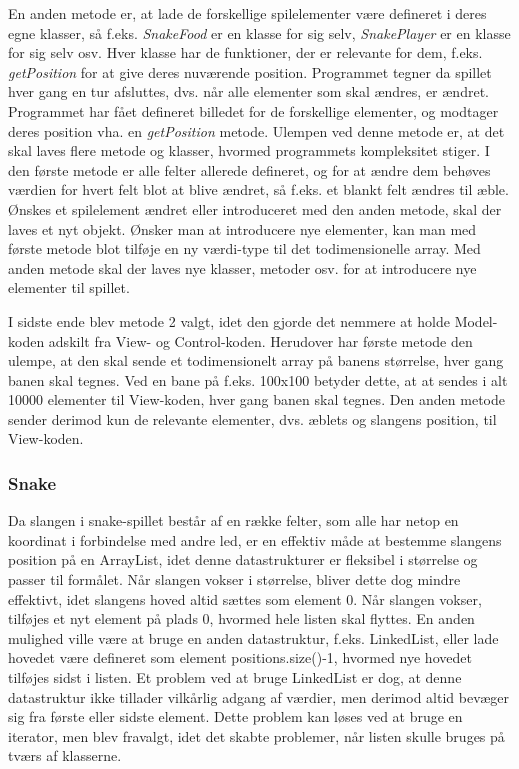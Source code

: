 \documentclass{report}
\begin{document}
En anden metode er, at lade de forskellige spilelementer være defineret i deres egne klasser, så f.eks. \textit{SnakeFood} er en klasse for sig selv, \textit{SnakePlayer} er en klasse for sig selv osv. Hver klasse har de funktioner, der er relevante for dem, f.eks. \textit{getPosition} for at give deres nuværende position. Programmet tegner da spillet hver gang en tur afsluttes, dvs. når alle elementer som skal ændres, er ændret. Programmet har fået defineret billedet for de forskellige elementer, og modtager deres position vha. en \textit{getPosition} metode.
Ulempen ved denne metode er, at det skal laves flere metode og klasser, hvormed programmets kompleksitet stiger. I den første metode er alle felter allerede defineret, og for at ændre dem behøves værdien for hvert felt blot at blive ændret, så f.eks. et blankt felt ændres til æble. Ønskes et spilelement ændret eller introduceret med den anden metode, skal der laves et nyt objekt. Ønsker man at introducere nye elementer, kan man med første metode blot tilføje en ny værdi-type til det todimensionelle array. Med anden metode skal der laves nye klasser, metoder osv. for at introducere nye elementer til spillet.
 
I sidste ende blev metode 2 valgt, idet den gjorde det nemmere at holde Model-koden adskilt fra View- og Control-koden. Herudover har første metode den ulempe, at den skal sende et todimensionelt array på banens størrelse, hver gang banen skal tegnes. Ved en bane på f.eks. 100x100 betyder dette, at at sendes i alt 10000 elementer til View-koden, hver gang banen skal tegnes. Den anden metode sender derimod kun de relevante elementer, dvs. æblets og slangens position, til View-koden.

\subsubsection{Snake}
Da slangen i snake-spillet består af en række felter, som alle har netop en koordinat i forbindelse med andre led, er en effektiv måde at bestemme slangens position på en ArrayList, idet denne datastrukturer er fleksibel i størrelse og passer til formålet. Når slangen vokser i størrelse, bliver dette dog mindre effektivt, idet slangens hoved altid sættes som element 0. Når slangen vokser, tilføjes et nyt element på plads 0, hvormed hele listen skal flyttes. En anden mulighed ville være at bruge en anden datastruktur, f.eks. LinkedList, eller lade hovedet være defineret som element positions.size()-1, hvormed nye hovedet tilføjes sidst i listen. Et problem ved at bruge LinkedList er dog, at denne datastruktur ikke tillader vilkårlig adgang af værdier, men derimod altid bevæger sig fra første eller sidste element. Dette problem kan løses ved at bruge en iterator, men blev fravalgt, idet det skabte problemer, når listen skulle bruges på tværs af klasserne.
\end{document}
